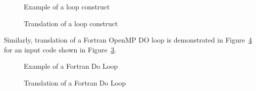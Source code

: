\lstset{language=C,basicstyle=\scriptsize}
\begin{figure}[htbp]
{\indent
  {\mySmallFontSize
    \begin{latexonly}
    
    \end{latexonly}
    \begin{htmlonly}
    
    \end{htmlonly}
  }
}
\caption{Example of a loop construct}
\label{Manual:omp:ompfor}
\end{figure}

\begin{figure}[htbp]
{\indent
  {\mySmallFontSize
    \begin{latexonly}
    
    \end{latexonly}
    \begin{htmlonly}
    
    \end{htmlonly}
  }
}
\caption{Translation of a loop construct}
\label{Manual:omp:ompfor-trans}
\end{figure}

\clearpage
Similarly, translation of a Fortran OpenMP DO loop 
is demonstrated in
Figure~\ref{Manual:omp:do-default-trans-f} for an input code shown in
Figure~\ref{Manual:omp:do-default-f}.

\lstset{language=Fortran,basicstyle=\scriptsize}
\lstset{language=Fortran,basicstyle=\scriptsize,numbers=left}
\begin{figure}[htbp]
{\indent
  {\mySmallFontSize
    \begin{latexonly}
    
    \end{latexonly}
    \begin{htmlonly}
    
    \end{htmlonly}
  }
}
\caption{Example of a Fortran Do Loop}
\label{Manual:omp:do-default-f}
\end{figure}

\begin{figure}[htbp]
{\indent
  {\mySmallFontSize
    \begin{latexonly}
    
    \end{latexonly}
    \begin{htmlonly}
    
    \end{htmlonly}
  }
}
\caption{Translation of a Fortran Do Loop}
\label{Manual:omp:do-default-trans-f}
\end{figure}


